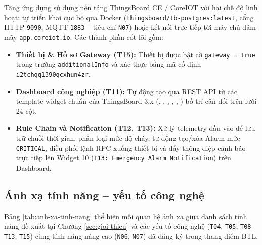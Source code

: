 Tầng ứng dụng sử dụng nền tảng ThingsBoard CE / CoreIOT \cite{ref_thingsboard} với hai chế độ linh hoạt: tự triển khai cục bộ qua Docker (\texttt{thingsboard/tb-postgres:latest}, cổng HTTP \texttt{9090}, MQTT \texttt{1883} -- tiêu chí \texttt{N07}) hoặc kết nối trực tiếp tới máy chủ đám mây \texttt{app.coreiot.io}. Các thành phần cốt lõi gồm:
\begin{itemize}[leftmargin=*, itemsep=2pt]
  \item \textbf{Thiết bị \& Hồ sơ Gateway (T15):} Thiết bị  được bật cờ \texttt{gateway = true} trong trường \texttt{additionalInfo} và xác thực bằng mã cố định \texttt{i2tchqq1390qcxhun4zr}.
  \item \textbf{Dashboard công nghiệp (T11):} Tự động tạo qua REST API từ các template widget chuẩn của ThingsBoard 3.x (, , , , , ) bố trí cân đối trên lưới 24 cột.
  \item \textbf{Rule Chain và Notification (T12, T13):} Xử lý telemetry đầu vào để lưu trữ chuỗi thời gian, phân loại mức độ cháy, tự động tạo/xóa Alarm mức \texttt{CRITICAL}, điều phối lệnh RPC xuống thiết bị và đẩy thông điệp cảnh báo trực tiếp lên Widget 10 (\texttt{T13: Emergency Alarm Notification}) trên Dashboard.
\end{itemize}

\subsection{Ánh xạ tính năng -- yếu tố công nghệ}
\label{subsec:anh-xa-tinh-nang}

Bảng \ref{tab:anh-xa-tinh-nang} thể hiện mối quan hệ ánh xạ giữa danh sách tính năng đề xuất tại Chương \ref{sec:gioi-thieu} và các yếu tố công nghệ (\texttt{T04}, \texttt{T05}, \texttt{T08}--\texttt{T13}, \texttt{T15}) cùng tính năng nâng cao (\texttt{N06}, \texttt{N07}) đã đăng ký trong thang điểm BTL.

